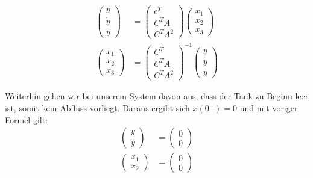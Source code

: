 \begin{align*}
    \left(\begin{array}{c} y \\ \dot y \\ \ddot y \end{array}\right) &= \left(\begin{array}{l} c^T \\ C^T A \\ C^T A^2 \end{array}\right) \left(\begin{array}{c} x_1 \\ x_2 \\ x_3 \end{array}\right) \\
    \left(\begin{array}{c} x_1 \\ x_2 \\ x_3 \end{array}\right) &= \left(\begin{array}{l} C^T \\ C^T A \\ C^T A^2 \end{array}\right)^{-1} \left(\begin{array}{c} y \\ \dot y \\ \ddot y \end{array}\right)
\end{align*}

Weiterhin gehen wir bei unserem System davon aus, dass der Tank zu Beginn leer ist, somit kein Abfluss vorliegt. Daraus ergibt sich $x(0^-) = 0$ und mit voriger Formel gilt:
\begin{align*}
    \left(\begin{array}{c} y \\ \dot y \end{array}\right) &= \left(\begin{array}{c}0\\0\end{array}\right) \\
    \left(\begin{array}{c} x_1 \\ x_2 \end{array}\right) &= \left(\begin{array}{c}0\\0\end{array}\right)
\end{align*}


